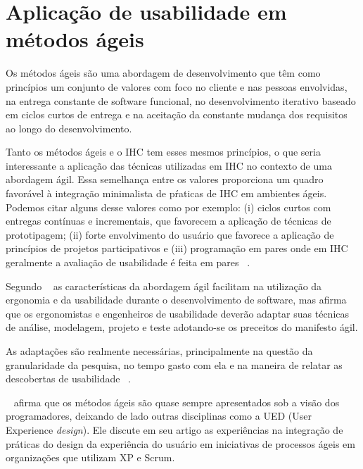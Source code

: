 

\section{Aplicação de usabilidade em métodos ágeis}
	
	Os métodos ágeis são uma abordagem de desenvolvimento que têm como princípios um conjunto de valores com foco no cliente e nas pessoas envolvidas, na entrega constante de software funcional, no desenvolvimento iterativo baseado em ciclos curtos de entrega e na aceitação da constante mudança dos requisitos ao longo do desenvolvimento. 

	Tanto os métodos ágeis e o IHC tem esses mesmos princípios, o que seria interessante a aplicação das técnicas utilizadas em IHC no contexto de uma abordagem ágil. Essa semelhança entre os valores proporciona um quadro favorável à integração minimalista de pŕaticas de IHC em ambientes ágeis. Podemos citar alguns desse valores como por exemplo: (i) ciclos curtos com entregas contínuas e incrementais, que favorecem a aplicação de técnicas de prototipagem; (ii) forte envolvimento do usuário que favorece a aplicação de princípios de projetos participativos e (iii) programação em pares onde em IHC geralmente a avaliação de usabilidade é feita em pares ~\cite{barbosa2008estrategia}. 

	Segundo ~ as características da abordagem ágil facilitam na utilização da ergonomia e da usabilidade durante o desenvolvimento de software, mas afirma que os ergonomistas e engenheiros de usabilidade deverão adaptar suas técnicas de análise, modelagem, projeto e teste adotando-se os preceitos do manifesto ágil.
	
	As adaptações são realmente necessárias, principalmente na questão da granularidade da pesquisa, no tempo gasto com ela e na maneira de relatar as descobertas de usabilidade ~\cite{santos2012}.


	~ afirma que os métodos ágeis são quase sempre apresentados sob a visão dos programadores, deixando de lado outras disciplinas como a UED (User Experience \emph{design}). Ele discute em seu artigo as experiências na integração de práticas do design da experiência do usuário em iniciativas de processos ágeis em organizações que utilizam XP e Scrum. %

